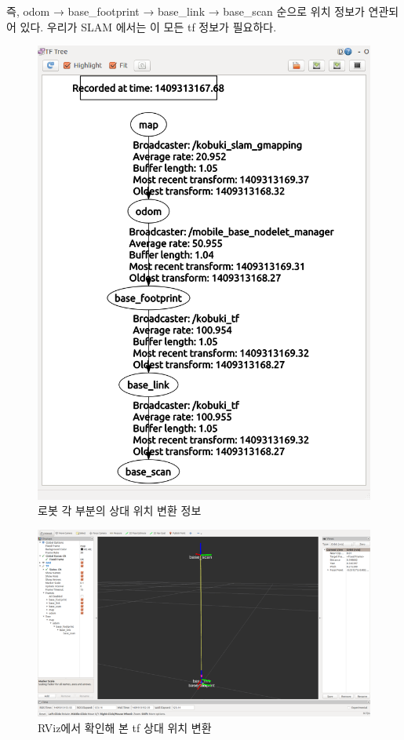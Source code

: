 즉, odom → base\_footprint → base\_link → base\_scan 순으로 위치 정보가 연관되어 있다. 우리가 SLAM 에서는 이 모든 tf 정보가 필요하다.

\begin{figure}[h]
\centering
\includegraphics[width=0.7\columnwidth]{pictures/chapter11/slam_tf.png}
\caption{로봇 각 부분의 상대 위치 변환 정보}
\end{figure}

\begin{figure}[h]
\centering
\includegraphics[width=0.9\columnwidth]{pictures/chapter11/rviz_slam_tf.png}
\caption{RViz에서 확인해 본 tf 상대 위치 변환}
\end{figure}

